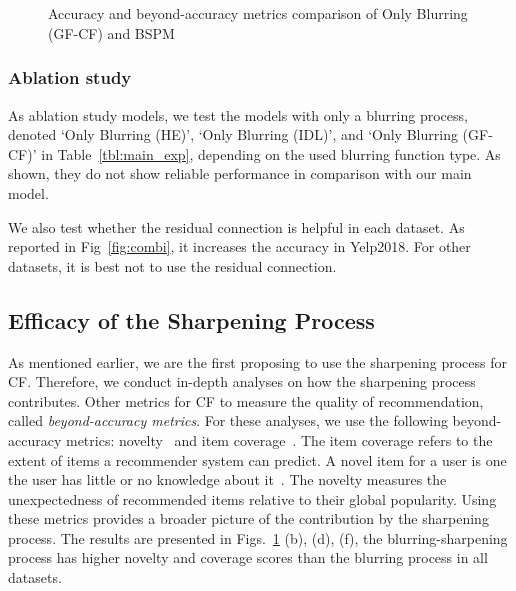 \documentclass[sigconf,natbib=true]{acmart}
\begin{document}
\begin{figure}[t]
    \centering
    \hfill
    \\
    \hfill
    \\
    \hfill
\caption{Accuracy and beyond-accuracy metrics comparison of Only Blurring (GF-CF) and BSPM}
\label{fig:compare}
\end{figure}

\subsubsection{Ablation study} As ablation study models, we test the models with only a blurring process, denoted `Only Blurring (HE)', `Only Blurring (IDL)', and `Only Blurring (GF-CF)' in Table~\ref{tbl:main_exp}, depending on the used blurring function type. As shown, they do not show reliable performance in comparison with our main model.

We also test whether the residual connection is helpful in each dataset. As reported in Fig~\ref{fig:combi}, it increases the accuracy in Yelp2018. For other datasets, it is best not to use the residual connection. 


\subsection{Efficacy of the Sharpening Process}
As mentioned earlier, we are the first proposing to use the sharpening process for CF. Therefore, we conduct in-depth analyses on how the sharpening process contributes. Other metrics for CF to measure the quality of recommendation, called \emph{beyond-accuracy metrics}. For these analyses, we use the following beyond-accuracy metrics: novelty~\cite{zhou2010solving} and item coverage~\cite{Herlocker2004Coverage}. The item coverage refers to the extent of items a recommender system can predict. A novel item for a user is one the user has little or no knowledge about it~\cite{Ge2010beyond}. The novelty measures the unexpectedness of recommended items relative to their global popularity. Using these metrics provides a broader picture of the contribution by the sharpening process. The results are presented in Figs.~\ref{fig:compare} (b), (d), (f), the blurring-sharpening process has higher novelty and coverage scores than the blurring process in all datasets.
\end{document}
